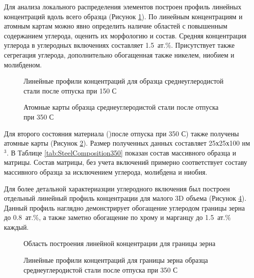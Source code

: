 Для анализа локального распределения элементов построен профиль линейных концентраций вдоль всего образца (Рисунок \cref{fig:SteelLinear1}). По линейным концентрациям и атомным картам можно явно определить наличие областей с повышенным содержанием углерода, оценить их морфологию и состав. Средняя концентрация углерода в углеродных включениях составляет 1.5~ат.\%. Присутствует также сегрегация углерода, дополнительно обогащенная также никелем, ниобием и молибденом.

\begin{figure}[ht]
	\caption{Линейные профили концентраций для образца среднеуглеродистой стали после отпуска при 150 \textdegree С \cite{scbibRyabov}}
	\label{fig:SteelLinear1}
\end{figure}

\begin{figure}[htb]
	\caption{Атомные карты образца среднеуглеродистой стали после отпуска при 350 \textdegree С \cite{scbibRyabov}}
	\label{fig:SteelAtomMaps2}
\end{figure}

Для второго состояния материала ()после отпуска при 350 \textdegree С) также получены атомные карты (Рисунок \cref{fig:SteelAtomMaps2}). Размер полученных данных составляет 25х25х100 нм$^{3}$. В Таблице \cref{tab:SteelComposition350} показан состав массивного образца и матрицы. Состав матрицы, без учета включений примерно соответствует составу массивного образца за исключением углерода, молибдена и ниобия. 

Для более детальной характериазции углеродного включения был построен отдельный линейный профиль концентрации для малого 3D объема (Рисунок \cref{fig:SteelLinear2}). Данный профиль наглядно демонстрирует обогащение углеродом границы зерна до 0.8~ат.\%, а также заметно обогащение по хрому и марганцу до 1.5~ат.\% каждый.

\begin{figure}[htb]
	\caption{Область построения линейной концентрации для границы зерна\cite{scbibRyabov}}
	\label{fig:SteelAtomMapsLin}
\end{figure}

\begin{figure}[htb]
	\caption{Линейные профили концентраций для границы зерна образца среднеуглеродистой стали после отпуска при 350 \textdegree С \cite{scbibRyabov}}
	\label{fig:SteelLinear2}
\end{figure}

